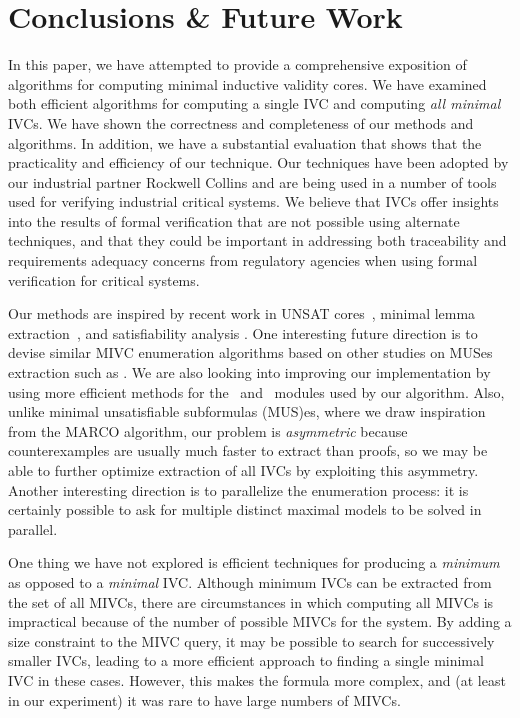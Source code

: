 \section{Conclusions \& Future Work}
\label{sec:conc}
In this paper, we have attempted to provide a comprehensive exposition of algorithms for computing minimal inductive validity cores.  We have examined both efficient algorithms for computing a single IVC and computing {\em all minimal} IVCs. We have shown
the correctness and completeness of our methods and algorithms.  In addition, we have a substantial evaluation that shows that the practicality and efficiency of our technique.
%
Our techniques have been adopted by our industrial partner Rockwell Collins and are being used in a number of tools used for verifying industrial critical systems.  We believe that IVCs offer insights into the results of formal verification that are not possible using alternate techniques, and that they could be important in addressing both traceability and requirements adequacy concerns from regulatory agencies when using formal verification for critical systems.

Our methods are inspired by recent work in UNSAT cores~\cite{zhang2003extracting}, minimal lemma extraction~\cite{piskac2016}, and satisfiability analysis \cite{marco2016fast}. One interesting future direction is to devise similar MIVC enumeration algorithms based on other studies on MUSes extraction such as \cite{nadel2014accelerated}.  We are also looking into improving our implementation by using more  efficient methods for the \isadeq ~and \getivc ~modules used by our algorithm.  Also, unlike minimal unsatisfiable subformulas (MUS)es, where we draw inspiration from the MARCO algorithm, our problem is {\em asymmetric} because counterexamples are usually much faster to extract than proofs, so we may be able to further optimize extraction of all IVCs by exploiting this asymmetry.  Another interesting direction is to parallelize the enumeration process: it is certainly possible to ask for multiple distinct maximal models to be solved in parallel.

One thing we have not explored is efficient techniques for producing a {\em minimum} as opposed to a {\em minimal} IVC.  Although minimum IVCs can be extracted from the set of all MIVCs, there are circumstances in which computing all MIVCs is impractical because of the number of possible MIVCs for the system.  By adding a size constraint to the MIVC query, it may be possible to search for successively smaller IVCs, leading to a more efficient approach to finding a single minimal IVC in these cases.  However, this makes the formula more complex, and (at least in our experiment) it was rare to have large numbers of MIVCs.

